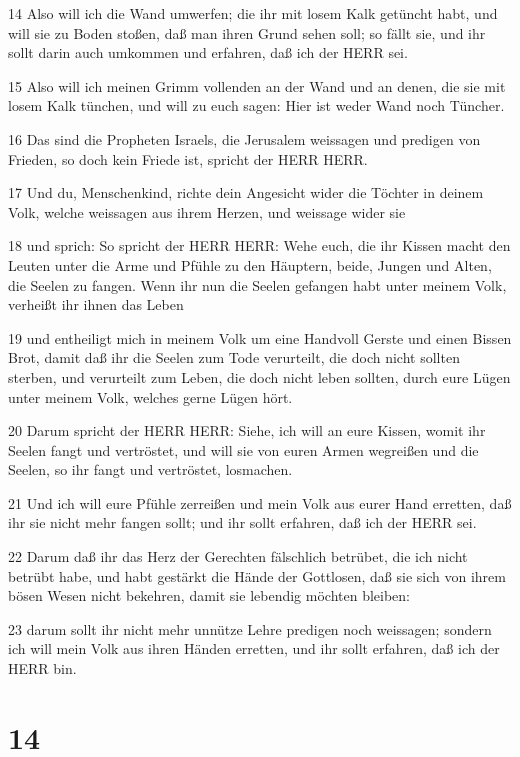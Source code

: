 \par 14 Also will ich die Wand umwerfen; die ihr mit losem Kalk getüncht habt, und will sie zu Boden stoßen, daß man ihren Grund sehen soll; so fällt sie, und ihr sollt darin auch umkommen und erfahren, daß ich der HERR sei.
\par 15 Also will ich meinen Grimm vollenden an der Wand und an denen, die sie mit losem Kalk tünchen, und will zu euch sagen: Hier ist weder Wand noch Tüncher.
\par 16 Das sind die Propheten Israels, die Jerusalem weissagen und predigen von Frieden, so doch kein Friede ist, spricht der HERR HERR.
\par 17 Und du, Menschenkind, richte dein Angesicht wider die Töchter in deinem Volk, welche weissagen aus ihrem Herzen, und weissage wider sie
\par 18 und sprich: So spricht der HERR HERR: Wehe euch, die ihr Kissen macht den Leuten unter die Arme und Pfühle zu den Häuptern, beide, Jungen und Alten, die Seelen zu fangen. Wenn ihr nun die Seelen gefangen habt unter meinem Volk, verheißt ihr ihnen das Leben
\par 19 und entheiligt mich in meinem Volk um eine Handvoll Gerste und einen Bissen Brot, damit daß ihr die Seelen zum Tode verurteilt, die doch nicht sollten sterben, und verurteilt zum Leben, die doch nicht leben sollten, durch eure Lügen unter meinem Volk, welches gerne Lügen hört.
\par 20 Darum spricht der HERR HERR: Siehe, ich will an eure Kissen, womit ihr Seelen fangt und vertröstet, und will sie von euren Armen wegreißen und die Seelen, so ihr fangt und vertröstet, losmachen.
\par 21 Und ich will eure Pfühle zerreißen und mein Volk aus eurer Hand erretten, daß ihr sie nicht mehr fangen sollt; und ihr sollt erfahren, daß ich der HERR sei.
\par 22 Darum daß ihr das Herz der Gerechten fälschlich betrübet, die ich nicht betrübt habe, und habt gestärkt die Hände der Gottlosen, daß sie sich von ihrem bösen Wesen nicht bekehren, damit sie lebendig möchten bleiben:
\par 23 darum sollt ihr nicht mehr unnütze Lehre predigen noch weissagen; sondern ich will mein Volk aus ihren Händen erretten, und ihr sollt erfahren, daß ich der HERR bin.

\chapter{14}

